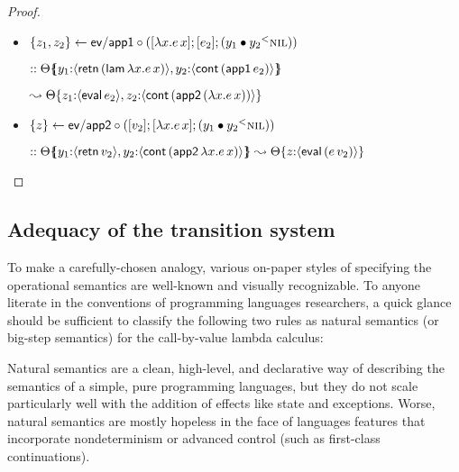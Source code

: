 \begin{proof}
\begin{itemize}
    \medskip


  \item $\{{z_1, z_2}\} \leftarrow {\sf ev/app1} \circ {([{\lambda x.e\,x}]; {[{e_2}]; {({{y_1} \mathbin{\bullet}{y_2}}{^{<}}{\textsc{nil}})}})}$

    \qquad $:: {\Theta}\mbox{$\{\hspace{-4pt}\{$}{{y_1{:}\langle {{\sf retn}\,({\sf lam}\,\lambda x.e\,x)} \rangle},{y_2{:}\langle {{\sf cont}\,({\sf app1}\,e_2)} \rangle}}\mbox{$\}\hspace{-4pt}\}$}$

    \qquad\qquad
               $\leadsto
               {\Theta}\{{{z_1{:}\langle {{\sf eval}\,e_2} \rangle},{z_2{:}\langle {{\sf cont}\,({\sf app2}\,(\lambda x.e\,x))} \rangle}}\} $

  \item $\{{z}\} \leftarrow {\sf ev/app2} \circ {([{v_2}]; {[{\lambda x.e\,x}]; {({{y_1} \mathbin{\bullet}{y_2}}{^{<}}{\textsc{nil}})}})}$

    \qquad $:: {\Theta}\mbox{$\{\hspace{-4pt}\{$}{{y_1{:}\langle {{\sf retn}\,v_2} \rangle},{y_2{:}\langle {{\sf cont}\,({\sf app2}\,\lambda x.e\,x)} \rangle}}\mbox{$\}\hspace{-4pt}\}$}
               \leadsto
               {\Theta}\{{z{:}\langle {{\sf eval}\,(e\,v_2)} \rangle}\} $

  \end{itemize}
\end{proof}

\subsection{Adequacy of the transition system}
\label{sec:nat-ssos-adequacy-absmachine}


To make a carefully-chosen analogy, various on-paper styles of
specifying the operational semantics are well-known and visually
recognizable.  To anyone literate in the conventions of programming
languages researchers, a quick glance should be sufficient to classify
the following two rules as natural semantics (or big-step semantics)
for the call-by-value lambda calculus:


Natural semantics are a clean, high-level, and declarative way of
describing the semantics of a simple, pure programming languages, but
they do not scale particularly well with the addition of effects like
state and exceptions. Worse, natural semantics are mostly hopeless in
the face of languages features that incorporate nondeterminism or
advanced control (such as first-class continuations). 

